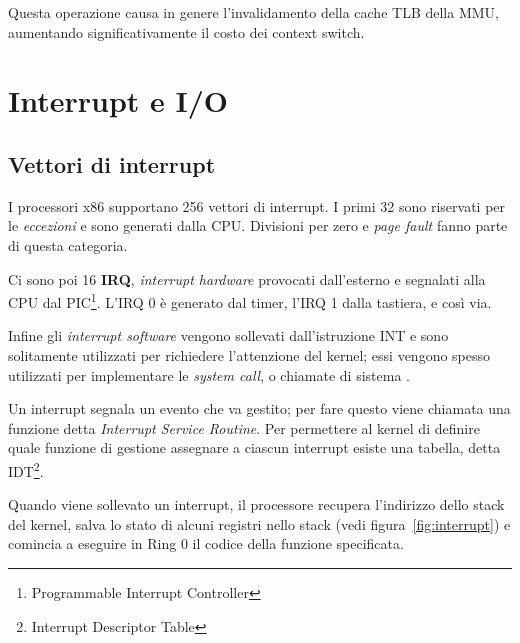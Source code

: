 \documentclass[12pt,a4paper]{report}
\begin{document}
		Questa operazione causa in genere l'invalidamento della cache TLB della MMU, aumentando significativamente
		il costo dei context switch.
		
	\section{Interrupt e I/O}
		\subsection{Vettori di interrupt}
			I processori x86 supportano 256 vettori di interrupt.
			I primi 32 sono riservati per le \emph{eccezioni} e sono generati dalla CPU. Divisioni per zero e \emph{page fault}
			fanno parte di questa categoria.
			
			Ci sono poi 16 \textbf{IRQ}, \emph{interrupt hardware} provocati dall'esterno e segnalati alla CPU dal PIC\footnote{Programmable Interrupt Controller}.
			L'IRQ 0 è generato dal timer, l'IRQ 1 dalla tastiera, e così via.
			
			Infine gli \emph{interrupt software} vengono sollevati dall'istruzione INT e sono solitamente utilizzati per richiedere l'attenzione del kernel;
			essi vengono spesso utilizzati per implementare le \emph{system call}, o chiamate di sistema \cite{OSDEV_Interrupts}.
			
			Un interrupt segnala un evento che va gestito; per fare questo viene chiamata una funzione detta \emph{Interrupt Service Routine}.
			Per permettere al kernel di definire quale funzione di gestione assegnare a ciascun interrupt esiste una tabella, detta IDT\footnote{Interrupt Descriptor Table}.
			
			Quando viene sollevato un interrupt, il processore recupera l'indirizzo dello stack del kernel, salva lo stato di alcuni registri
			nello stack (vedi figura~\ref{fig:interrupt}) e comincia a eseguire in Ring 0 il codice della funzione specificata.
						
\end{document}
